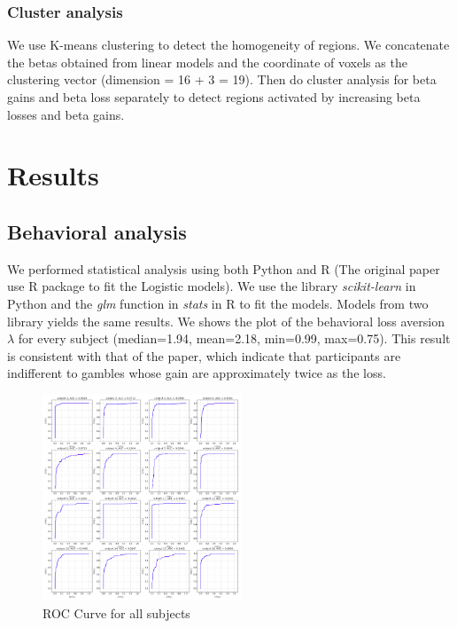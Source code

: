 \documentclass[11pt]{article}
\begin{document}
\subsubsection{Cluster analysis}

We use K-means clustering to detect the homogeneity of regions. We concatenate 
the betas obtained from linear models and the coordinate of voxels as the 
clustering vector (dimension = 16 + 3 = 19). Then do cluster analysis for beta 
gains and beta loss separately to detect regions activated by increasing beta 
losses and beta gains.


\section{Results}

\subsection{Behavioral analysis}

We performed statistical analysis using both Python and R (The original paper 
use R package to fit the Logistic models). We use the library 
\emph{scikit-learn} in Python and the \emph{glm} function in \emph{stats} in R 
to fit the models. Models from two library yields the same results. We shows 
the plot of the behavioral loss aversion $\lambda$ for every subject 
(median=1.94, mean=2.18, min=0.99, max=0.75). This result is consistent with 
that of the paper, which indicate that participants are indifferent to gambles 
whose gain are approximately twice as the loss. 


\begin{figure}
  \begin{center}
    \includegraphics[width=0.53\textwidth]{figures/Regression1/roc_curve.png} 
    \caption{ROC Curve for all subjects}
  \end{center}
\end{figure}
\end{document}
